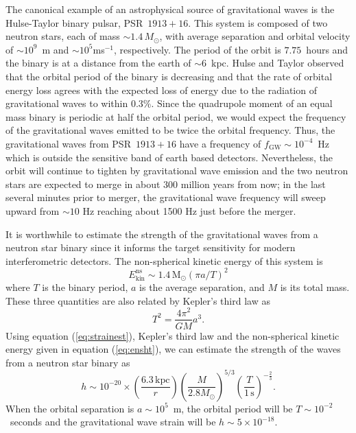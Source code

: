 The canonical example of an astrophysical source of gravitational waves is the
Hulse-Taylor binary pulsar, PSR~$1913+16$\cite{1975ApJ...195L..51H}. This
system is composed of two neutron stars, each of mass $\sim 1.4\,M_\odot$,
with average separation and orbital velocity of $\sim10^9$~m and $\sim
10^5$ms$^{-1}$, respectively. The period of the orbit is $7.75$~hours and the
binary is at a distance from the earth of $\sim 6$~kpc.  Hulse and Taylor
observed that the orbital period of the binary is decreasing and that the rate
of orbital energy loss agrees with the expected loss of energy due to the
radiation of gravitational waves to within
$0.3\%$\cite{Taylor:1982,Taylor:1989}.   Since the quadrupole moment
of an equal mass binary is periodic at half the orbital period, we would
expect the frequency of the gravitational waves emitted to be twice
the orbital frequency.  Thus, the gravitational waves from PSR~$1913+16$ have
a frequency of $f_\mathrm{GW} \sim 10^{-4}$~Hz which is outside the
sensitive band of earth based detectors.   Nevertheless,  the orbit
will continue to tighten by gravitational wave emission and the two
neutron stars are expected to merge in about 300 million years from
now;   in the last several minutes prior to merger,  the gravitational
wave frequency will sweep upward from $\sim 10$ Hz reaching about 1500
Hz just before the merger.

It is worthwhile to estimate the strength of the gravitational waves from
a neutron star binary since it informs the target sensitivity for
modern interferometric detectors.   The non-spherical kinetic energy
of this system is 
\begin{equation}
E_\mathrm{kin}^\mathrm{ns} \sim 
1.4\,\mathrm{M}_\odot (\pi a / T)^2
\label{eq:ensht}
\end{equation}
where $T$ is the binary period,  $a$ is the average separation,  and
$M$ is its total mass.   These three quantities are also related by 
Kepler's third law as
\begin{equation}
T^2 = \frac{4\pi^2}{GM}a^3.
\label{eq:kep3}
\end{equation}
Using equation (\ref{eq:strainest}), Kepler's third law and the non-spherical
kinetic energy given in equation (\ref{eq:ensht}), we can estimate the 
strength of the waves from a neutron star binary as
\begin{equation}
h \sim 10^{-20} \times 
\left(\frac{6.3\,\mathrm{kpc}}{r}\right)
\left(\frac{M}{2.8M_\odot}\right)^{5/3}
\left(\frac{T}{1\,\mathrm{s}}\right)^{-\frac{2}{3}}.
\label{eq:binaryest}
\end{equation}
When the orbital separation
is $a \sim 10^5$~m,  the orbital period will be $T\sim10^{-2}$~seconds and
the gravitational wave strain will be $h \sim 5 \times 10^{-18}$.

